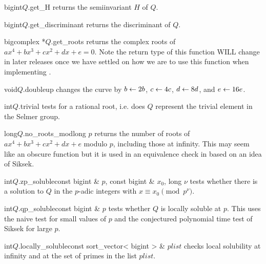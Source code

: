 \begin{cfcode}{bigint}{$Q$.get_H}{}
  returns the semiinvariant $H$ of $Q$.
\end{cfcode}

\begin{cfcode}{bigint}{$Q$.get_discriminant}{}
  returns the discriminant of $Q$.
\end{cfcode}

\begin{cfcode}{bigcomplex *}{$Q$.get_roots}{}
  returns the complex roots of $a x^4 + b x^3 + c x^2 +d x + e = 0$.  Note the return type of this
  function WILL change in later releases once we have settled on how we are to use this function
  when implementing .
\end{cfcode}

\begin{fcode}{void}{$Q$.doubleup}{}
  changes the curve by $b \leftarrow 2b$, $c \leftarrow 4 c$, $d \leftarrow 8 d$, and $e \leftarrow 16 e$.
\end{fcode}

\begin{cfcode}{int}{$Q$.trivial}{}
  tests for a rational root, i.e. does $Q$ represent the trivial element in the Selmer group.
\end{cfcode}

\begin{cfcode}{long}{$Q$.no_roots_mod}{long $p$}
  returns the number of roots of $a x^4 + b x^3 + c x^2 +d x +e$ modulo $p$, including those at
  infinity.  This may seem like an obscure function but it is used in an equivalence check in
   based on an idea of Siksek.

\end{cfcode}

\begin{cfcode}{int}{$Q$.zp_soluble}{const bigint & $p$, const bigint & $x_0$, long $\nu$}
  tests whether there is a solution to $Q$ in the $p$-adic integers with $x \equiv x_0
  \pmod{p^{\nu}}$.
\end{cfcode}

\begin{cfcode}{int}{$Q$.qp_soluble}{const bigint & $p$}
  tests whether $Q$ is locally soluble at $p$.  This uses the naive test for small values of $p$
  and the conjectured polynomial time test of Siksek for large $p$.

\end{cfcode}

\begin{cfcode}{int}{$Q$.locally_soluble}{const sort_vector< bigint > & $\mathit{plist}$}
  checks local solubility at infinity and at the set of primes in the list $\mathit{plist}$.
\end{cfcode}


